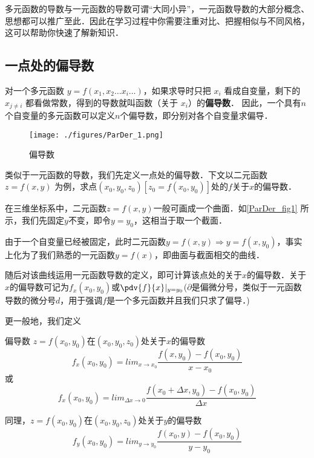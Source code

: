 
多元函数的导数与一元函数的导数可谓“大同小异”，一元函数导数的大部分概念、思想都可以推广至此．因此在学习过程中你需要注重对比、把握相似与不同风格，这可以帮助你快速了解新知识．

\subsection{一点处的偏导数}
对一个多元函数 $y = f(x_1, x_2 \dots x_i \dots)$，如果求导时只把 $x_i$ 看成自变量，剩下的 $x_{j \ne i}$ 都看做常数，得到的导数就叫函数（关于 $x_i$）的\textbf{偏导数}． 因此，一个具有$n$个自变量的多元函数可以定义$n$个偏导数，即分别对各个自变量求偏导．

\begin{figure}[ht]
\centering
\texttt{[image: ./figures/ParDer\_1.png]}
\caption{偏导数} \label{ParDer_fig1}
\end{figure}

类似于一元函数的导数，我们先定义一点处的偏导数．下文以二元函数 $z=f(x,y)$ 为例，求点$(x_0,y_0,z_0) [z_0=f(x_0,y_0)]$处的$f$关于$x$的偏导数．

在三维坐标系中，二元函数$z=f(x,y)$一般可画成一个曲面．如\autoref{ParDer_fig1} 所示，我们先固定$y$不变，即令$y=y_0$，这相当于取一个截面．

由于一个自变量已经被固定，此时二元函数$y=f(x,y)\Rightarrow y=f(x,y_0)$，事实上化为了我们熟悉的一元函数$y=f(x)$，即曲面与截面相交的曲线．

随后对该曲线运用一元函数导数的定义，即可计算该点处的关于$x$的偏导数．关于$x$的偏导数可记为$f_x(x_0,y_0)$或$\pdv{f}{x}|_{y=y_0}$($\partial$是偏微分号，类似于一元函数导数的微分号$d$，用于强调$f$是一个多元函数并且我们只求了偏导．)

更一般地，我们定义
\begin{definition}{偏导数}
$z=f(x_0,y_0)$在$(x_0,y_0,z_0)$处关于$x$的偏导数
\begin{equation}
f_x(x_0,y_0)=lim_{x\to x_0} \frac{f(x,y_0)-f(x_0,y_0)}{x-x_0}
\end{equation}
或
\begin{equation}
f_x(x_0,y_0)=lim_{\Delta x \to 0} \frac{f(x_0+\Delta x,y_0)-f(x_0,y_0)}{\Delta x}
\end{equation}

同理，$z=f(x_0,y_0)$在$(x_0,y_0,z_0)$处关于$y$的偏导数
\begin{equation}
f_y(x_0,y_0)=lim_{y\to y_0} \frac{f(x_0,y)-f(x_0,y_0)}{y-y_0}
\end{equation}
\end{definition}

